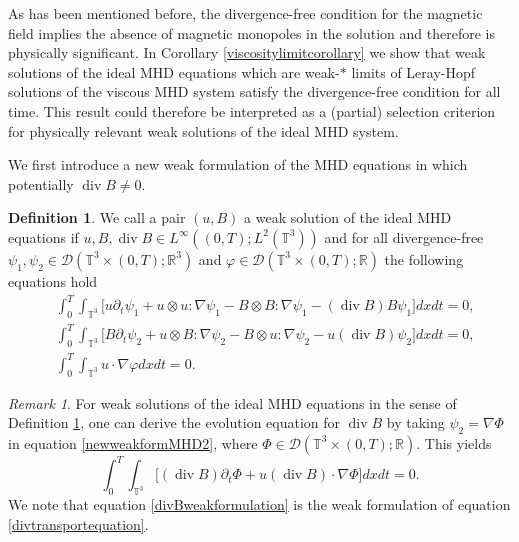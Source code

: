 \documentclass[12pt,a4paper]{article}
\theoremstyle{definition}
\newtheorem{definition}[theorem]{Definition}
\theoremstyle{remark}
\newtheorem{remark}[theorem]{Remark}
\numberwithin{equation}{section}
\DeclareMathOperator{\Div}{div}
\begin{document}
As has been mentioned before, the divergence-free condition for the magnetic field implies the absence of magnetic monopoles in the solution and therefore is physically significant. In Corollary \ref{viscositylimitcorollary} we show that weak solutions of the ideal MHD equations which are weak-$*$ limits of Leray-Hopf solutions of the viscous MHD system satisfy the divergence-free condition for all time. This result could therefore be interpreted as a (partial) selection criterion for physically relevant weak solutions of the ideal MHD system.

We first introduce a new weak formulation of the MHD equations in which potentially $\Div B \neq 0$.
\begin{definition} \label{newweaksolMHDdef}
We call a pair $(u,B)$ a weak solution of the ideal MHD equations if $u, B, \Div B \in L^\infty ((0,T); L^2 (\mathbb{T}^3))$ and for all divergence-free $\psi_1, \psi_2 \in \mathcal{D} (\mathbb{T}^3 \times (0,T);\mathbb{R}^3)$ and $\varphi \in \mathcal{D} (\mathbb{T}^3 \times (0,T);\mathbb{R})$ the following equations hold
\begin{align}
&\int_0^T \int_{\mathbb{T}^3} \bigg[ u \partial_t \psi_1 + u \otimes u : \nabla \psi_1 - B \otimes B : \nabla \psi_1 - (\Div B ) B \psi_1 \bigg] dx dt = 0, \label{newweakformMHD1} \\
&\int_0^T \int_{\mathbb{T}^3} \bigg[ B \partial_t \psi_2 + u \otimes B : \nabla \psi_2 - B \otimes u : \nabla \psi_2 - u (\Div B) \psi_2 \bigg] dx dt = 0, \label{newweakformMHD2} \\
&\int_0^T \int_{\mathbb{T}^3} u \cdot \nabla \varphi dx dt = 0. \label{newweakformMHD3}
\end{align}
\end{definition}
\begin{remark} \label{divtransportremark}
For weak solutions of the ideal MHD equations in the sense of Definition \ref{newweaksolMHDdef}, one can derive the evolution equation for $\Div B$ by taking $\psi_2 = \nabla \Phi$ in equation \eqref{newweakformMHD2}, where $\Phi \in \mathcal{D} (\mathbb{T}^3 \times (0,T);\mathbb{R})$. This yields
\begin{equation} \label{divBweakformulation}
\int_0^T \int_{\mathbb{T}^3} \bigg[ (\Div B) \partial_t \Phi + u (\Div B) \cdot \nabla \Phi \bigg] dx dt = 0.
\end{equation}
We note that equation \eqref{divBweakformulation} is the weak formulation of equation \eqref{divtransportequation}.
\end{remark}
\end{document}

